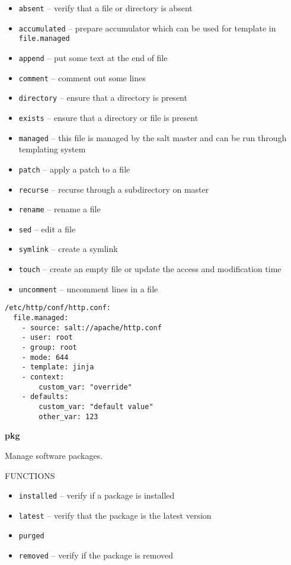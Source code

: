 \documentclass[landscape,a4paper,10pt]{article}
\begin{document}
\begin{multicols}{3}
\begin{itemize}
  \item \texttt{absent}  -- verify that a file or directory is absent
  \item \texttt{accumulated}  -- prepare accumulator which can be used for template in \texttt{file.managed}
  \item \texttt{append}  -- put some text at the end of file
  \item \texttt{comment}  -- comment out some lines
  \item \texttt{directory}  -- ensure that a directory is present
  \item \texttt{exists}  -- ensure that a directory or file is present
  \item \texttt{managed}  -- this file is managed by the salt master and can be run through templating system
  \item \texttt{patch}  -- apply a patch to a file
  \item \texttt{recurse}  -- recurse through a subdirectory on master
  \item \texttt{rename}  -- rename a file
  \item \texttt{sed}  -- edit a file
  \item \texttt{symlink}  -- create a symlink
  \item \texttt{touch}  -- create an empty file or update the access and modification time
  \item \texttt{uncomment}  -- uncomment lines in a file
\end{itemize}

\begin{verbatim}
/etc/http/conf/http.conf:
  file.managed:
    - source: salt://apache/http.conf
    - user: root
    - group: root
    - mode: 644
    - template: jinja
    - context:
        custom_var: "override"
    - defaults:
        custom_var: "default value"
        other_var: 123
\end{verbatim}

\bfseries{\LARGE{pkg}}

Manage software packages.

FUNCTIONS

\begin{itemize}
  \item \texttt{installed} -- verify if a package is installed
  \item \texttt{latest} -- verify that the package is the latest version
  \item \texttt{purged}
  \item \texttt{removed} -- verify if the package is removed
\end{itemize}


\end{multicols}
\end{document}
